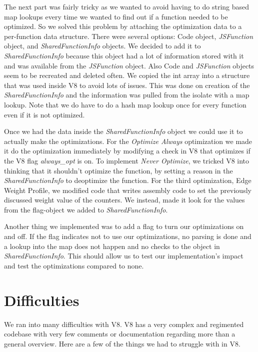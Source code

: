 \documentclass[twocolumn,showpacs,%
  nofootinbib,aps,superscriptaddress,%
  eqsecnum,prd,notitlepage,showkeys,10pt]{revtex4-1}
\begin{document}
The next part was fairly tricky as we wanted to avoid having to do string based map lookups every time we wanted to find out if a function needed to be optimized. So we solved this problem by attaching the optimization data to a per-function data structure. There were several options: Code object, \textit{JSFunction} object, and \textit{SharedFunctionInfo} objects. We decided to add it to \textit{SharedFunctionInfo} because this object had a lot of information stored with it and was available from the \textit{JSFunction} object. Also Code and \textit{JSFunction} objects seem to be recreated and deleted often. We copied the int array into a structure that was used inside V8 to avoid lots of issues. This was done on creation of the \textit{SharedFunctionInfo} and the information was pulled from the isolate with a map lookup. Note that we do have to do a hash map lookup once for every function even if it is not optimized.

Once we had the data inside the \textit{ SharedFunctionInfo } object we could use it to actually make the optimizations. For the \textit{Optimize Always} optimization we made it do the optimization immediately by modifying a check in V8 that optimizes if the V8 flag \textit{always\_opt} is on. To implement \textit{Never Optimize}, we tricked V8 into thinking that it shouldn't optimize the function, by setting a reason in the \textit{SharedFunctionInfo} to deoptimize the function. For the third optimization, Edge Weight Profile, we modified code that writes assembly code to set the previously discussed weight value of the counters. We instead, made it look for the values from the flag-object we added to \textit{SharedFunctionInfo}.

Another thing we implemented was to add a flag to turn our optimizations on and off. If the flag indicates not to use our optimizations, no parsing is done and a lookup into the map does not happen and no checks to the object in \textit{SharedFunctionInfo}. This should allow us to test our implementation's impact and test the optimizations compared to none.

\section {Difficulties}
We ran into many difficulties with V8. V8 has a very complex and regimented codebase with very few comments or documentation regarding more than a general overview. Here are a few of the things we had to struggle with in V8.
\end{document}
